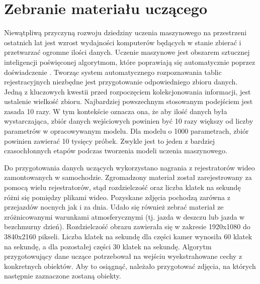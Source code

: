 %



\chapter{Zebranie materiału uczącego}

Niewątpliwą przyczyną rozwoju dziedziny uczenia maszynowego na przestrzeni ostatnich lat jest wzrost wydajności komputerów będących w stanie zbierać i przetwarzać ogromne ilości danych.
Uczenie maszynowe jest obszarem sztucznej inteligencji poświęconej algorytmom, które poprawiają się automatycznie poprzez doświadczenie \cite{Mitchell97}.
Tworząc system automatycznego rozpoznawania tablic rejestracyjnych niezbędne jest przygotowanie odpowiedniego zbioru danych.
Jedną z kluczowych kwestii przed rozpoczęciem kolekcjonowania informacji, jest ustalenie wielkość zbioru.
Najbardziej powszechnym stosowanym podejściem jest zasada 10 razy.
W tym kontekście oznacza ona, że aby ilość danych była wystarczająca, zbiór danych wejściowych powinien być 10 razy większy od liczby parametrów w opracowywanym modelu.
Dla modelu o 1000 parametrach, zbiór powinien zawierać 10 tysięcy próbek.
Zwykle jest to jeden z bardziej czasochłonnych etapów podczas tworzenia modeli uczenia maszynowego.

Do przygotowania danych uczących wykorzystano nagrania z rejestratorów wideo zamontowanych w samochodzie.
Zgromadzony materiał został zarejestrowany za pomocą wielu rejestratorów, stąd rozdzielczość oraz liczba klatek na sekundę różni się pomiędzy plikami wideo.
Pozyskane zdjęcia pochodzą zarówna z przejazdów nocnych jak i za dnia.
Udało się również zebrać materiał ze zróżnicowanymi warunkami atmosferycznymi (tj. jazda w deszczu lub jazda w bezchmurny dzień).
Rozdzielczość obrazu zawierała się w zakresie 1920x1080 do 3840x2160 pikseli.
Liczba klatek na sekundę dla części kamer wynosiła 60 klatek na sekundę, a dla pozostałej części 30 klatek na sekundę.
Algorytm przygotowujący dane uczące potrzebował na wejściu wyekstrahowane cechy z konkretnych obiektów.
Aby to osiągnąć, należało przygotować zdjęcia, na których następnie zaznaczone zostaną obiekty.

